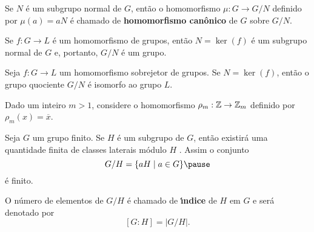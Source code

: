 \documentclass{beamer}
\begin{document}
    \begin{frame}
        \begin{definicao}
            Se $N$ é um subgrupo normal de $G$, \pause então o homomorfismo $\mu : G \to G/N$ \pause definido por $\mu(a) = aN$ \pause é chamado de \textbf{homomorfismo can\^onico} \pause de $G$ sobre $G/N$.
        \end{definicao}
    \end{frame}

    \begin{frame}
        \begin{lema}
            Se $f : G \to L$ é um homomorfismo de grupos, \pause então $N = \ker(f)$ \pause é um subgrupo normal de $G$ \pause e, portanto, $G/N$ é um grupo.
        \end{lema}
    \end{frame}

    \begin{frame}
        \begin{teorema}
            Seja $f : G \to L$ um homomorfismo sobrejetor \pause de grupos. \pause Se $N = \ker(f)$, \pause então o grupo quociente $G/N$ é isomorfo ao grupo $L$.
        \end{teorema}
    \end{frame}

    \begin{frame}
        \begin{exemplo}
            Dado um inteiro $m > 1$, \pause considere o homomorfismo $\rho_m : \mathbb{Z} \to \mathbb{Z}_m$ \pause definido por $\rho_m(x) = \overline{x}$.
        \end{exemplo}
    \end{frame}

    \begin{frame}
        Seja $G$ um grupo finito. \pause Se $H$ é um subgrupo de $G$, \pause então existirá uma quantidade finita de classes laterais m\'odulo $H$ \pause.
        Assim o conjunto
        \[
            G/H = \{aH \mid a \in G\} \pause
        \]
        é finito. \pause

        O n\'umero de elementos de $G/H$ \pause é chamado de \textbf{{\'\i}ndice} \pause de $H$ em $G$ \pause e será denotado por
        \[
            [G : H] = |G/H|.
        \]
    \end{frame}
\end{document}
